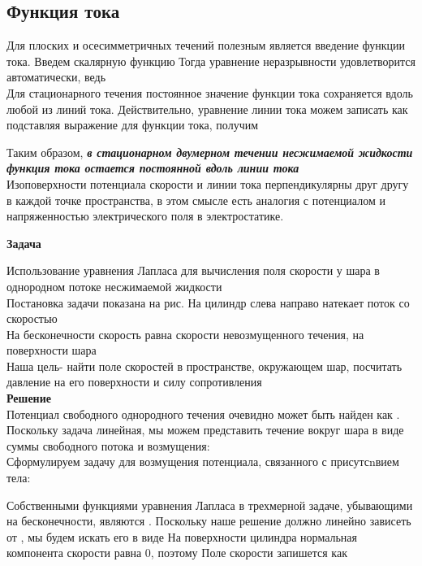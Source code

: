 \documentclass[
]{article}
\begin{document}
\subsection{Функция
тока}\label{ux444ux443ux43dux43aux446ux438ux44f-ux442ux43eux43aux430}

Для плоских и осесимметричных течений полезным является введение функции
тока. Введем скалярную функцию {}Тогда уравнение неразрывности
удовлетворится автоматически, ведь\\
{}Для стационарного течения постоянное значение функции тока сохраняется
вдоль любой из линий тока. Действительно, уравнение линии тока можем
записать как\\
{}подставляя выражение для функции тока, получим

{}Таким образом, \textbf{\emph{в стационарном двумерном течении
несжимаемой жидкости функция тока остается постоянной вдоль линии
тока}}\\
Изоповерхности потенциала скорости и линии тока перпендикулярны друг
другу в каждой точке пространства, в этом смысле есть аналогия с
потенциалом и напряженностью электрического поля в электростатике.

\textbf{Задача}

Использование уравнения Лапласа для вычисления поля скорости у шара в
однородном потоке несжимаемой жидкости\\
Постановка задачи показана на рис. На цилиндр слева направо натекает
поток со скоростью {}\\
На бесконечности скорость равна скорости невозмущенного течения, на
поверхности шара {}\\
Наша цель- найти поле скоростей в пространстве, окружающем шар,
посчитать давление на его поверхности и силу сопротивления\\
\textbf{Решение}\\
Потенциал свободного однородного течения очевидно может быть найден как
{}.\\
Поскольку задача линейная, мы можем представить течение вокруг шара в
виде суммы свободного потока и возмущения: {}\\
Сформулируем задачу для возмущения потенциала, связанного с присутсnвием
тела:

Собственными функциями уравнения Лапласа в трехмерной задаче, убывающими
на бесконечности, являются {}. Поскольку наше решение должно линейно
зависеть от {}, мы будем искать его в виде {}На поверхности цилиндра
нормальная компонента скорости равна 0, поэтому {}{}Поле скорости
запишется как
\end{document}
